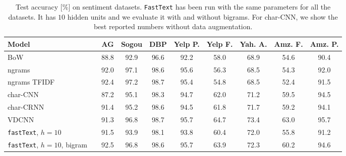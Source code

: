 \begin{table*}[t]
\centering
\small
\begin{tabular}{@{\hspace{3pt}}l@{\hspace{3pt}}ccccccccc}
\toprule
Model && AG & Sogou & DBP & Yelp P. & Yelp F. & Yah. A. & Amz. F. & Amz. P. \\
\midrule
BoW~\cite{zhang2015character}          && 88.8 & 92.9 & 96.6 & 92.2 & 58.0 & 68.9 & 54.6 & 90.4 \\
ngrams~\cite{zhang2015character}       && 92.0 & 97.1 & 98.6 & 95.6 & 56.3 & 68.5 & 54.3 & 92.0 \\
ngrams TFIDF~\cite{zhang2015character} && 92.4 & 97.2 & 98.7 & 95.4 & 54.8 & 68.5 & 52.4 & 91.5 \\
char-CNN~\cite{zhang2015text}          && 87.2 & 95.1 & 98.3 & 94.7 & 62.0 & 71.2 & 59.5 & 94.5 \\
char-CRNN~\cite{xiao2016efficient}     && 91.4 & 95.2 & 98.6 & 94.5 & 61.8 & 71.7 & 59.2 & 94.1 \\
VDCNN~\cite{conneau2016}               && 91.3 & 96.8 & 98.7 & 95.7 & 64.7 & 73.4 & 63.0 & 95.7 \\
\midrule
\texttt{fastText}, $h=10$             && 91.5 & 93.9 & 98.1 & 93.8 & 60.4 & 72.0 & 55.8 & 91.2 \\
\texttt{fastText}, $h=10$, bigram     && 92.5 & 96.8 & 98.6 & 95.7 & 63.9 & 72.3 & 60.2 & 94.6 \\
\bottomrule
\end{tabular}
\caption{Test accuracy [\%] on sentiment datasets.
\texttt{FastText} has been run with the same parameters for all the datasets. 
It has $10$ hidden units and we evaluate it with and without bigrams.
For char-CNN, we show the best reported numbers without data augmentation. 
}\label{tab:sent_res}
\end{table*}

